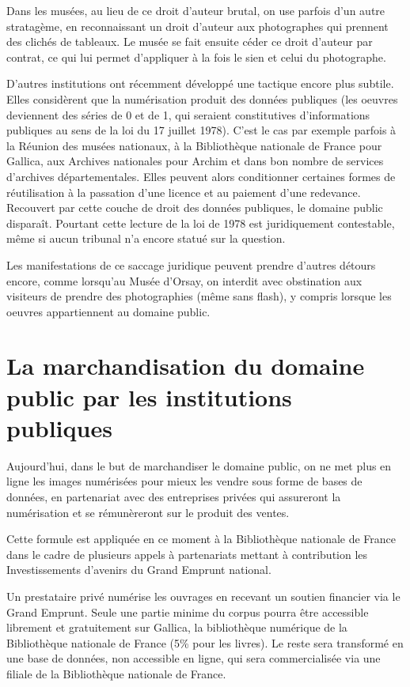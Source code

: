 Dans les musées, au lieu de ce droit d'auteur brutal, on use parfois d’un autre stratagème, en reconnaissant un droit d’auteur aux photographes qui prennent des clichés de tableaux. Le musée se fait ensuite céder ce droit d’auteur par contrat, ce qui lui permet d’appliquer à la fois le sien et celui du photographe.

D’autres institutions ont récemment développé une tactique encore plus subtile. Elles considèrent que la numérisation produit des données publiques (les oeuvres deviennent des séries de 0 et de 1, qui seraient constitutives d’informations publiques au sens de la loi du 17 juillet 1978). C’est le cas par exemple parfois à la Réunion des musées nationaux, à la Bibliothèque nationale de France pour Gallica, aux Archives nationales pour Archim et dans bon nombre de services d’archives départementales. Elles peuvent alors conditionner certaines formes de réutilisation à la passation d’une licence et au paiement d’une redevance. Recouvert par cette couche de droit des données publiques, le domaine public disparaît. Pourtant cette lecture de la loi de 1978 est juridiquement contestable, même si aucun tribunal n’a encore statué sur la question.

Les manifestations de ce saccage juridique peuvent prendre d’autres détours encore, comme lorsqu’au Musée d’Orsay, on interdit avec obstination aux visiteurs de prendre des photographies (même sans flash), y compris lorsque les oeuvres appartiennent au domaine public.

\section{La marchandisation du domaine public par les institutions publiques}

Aujourd’hui, dans le but de marchandiser le domaine public, on ne met plus en ligne les images numérisées pour mieux les vendre sous forme de bases de données, en partenariat avec des entreprises privées qui assureront la numérisation et se rémunèreront sur le produit des ventes.

Cette formule est appliquée en ce moment à la Bibliothèque nationale de France dans le cadre de plusieurs appels à partenariats mettant à contribution les Investissements d’avenirs du Grand Emprunt national.

Un prestataire privé numérise les ouvrages en recevant un soutien financier via le Grand Emprunt. Seule une partie minime du corpus pourra être accessible librement et gratuitement sur Gallica, la bibliothèque numérique de la Bibliothèque nationale de France (5\% pour les livres). Le reste sera transformé en une base de données, non accessible en ligne, qui sera commercialisée via une filiale de la Bibliothèque nationale de France.

